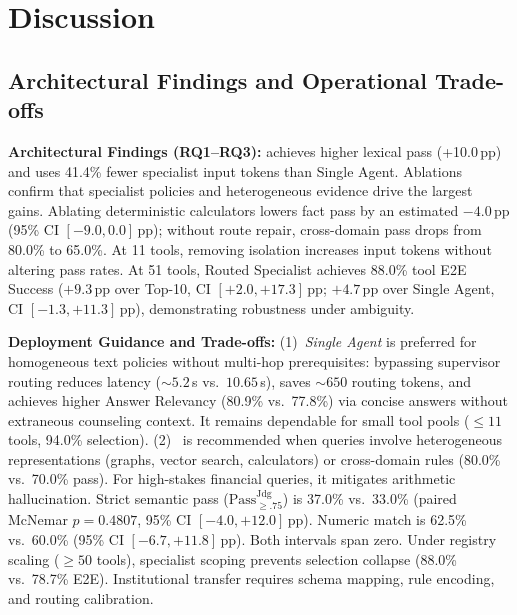 \section{Discussion}
\label{sec:discussion}

\subsection{Architectural Findings and Operational Trade-offs}

\textbf{Architectural Findings (RQ1--RQ3):}
\system{} achieves higher lexical pass (+10.0\,pp) and uses 41.4\% fewer specialist input tokens than Single Agent. Ablations confirm that specialist policies and heterogeneous evidence drive the largest gains. Ablating deterministic calculators lowers fact pass by an estimated $-4.0$\,pp (95\% CI $[-9.0, 0.0]$\,pp); without route repair, cross-domain pass drops from 80.0\% to 65.0\%. At 11 tools, removing isolation increases input tokens without altering pass rates. At 51 tools, Routed Specialist achieves 88.0\% tool E2E Success ($+9.3$\,pp over Top-10, CI $[+2.0, +17.3]$\,pp; $+4.7$\,pp over Single Agent, CI $[-1.3, +11.3]$\,pp), demonstrating robustness under ambiguity.

\textbf{Deployment Guidance and Trade-offs:}
(1)~\emph{Single Agent} is preferred for homogeneous text policies without multi-hop prerequisites: bypassing supervisor routing reduces latency (${\sim}5.2$\,s vs.\ $10.65$\,s), saves ${\sim}650$ routing tokens, and achieves higher Answer Relevancy (80.9\% vs.\ 77.8\%) via concise answers without extraneous counseling context. It remains dependable for small tool pools ($\le 11$ tools, 94.0\% selection).
(2)~\emph{\system{}} is recommended when queries involve heterogeneous representations (graphs, vector search, calculators) or cross-domain rules (80.0\% vs.\ 70.0\% pass). For high-stakes financial queries, it mitigates arithmetic hallucination. Strict semantic pass ($\text{Pass}_{\ge .75}^{\text{Jdg}}$) is 37.0\% vs.\ 33.0\% (paired McNemar $p{=}0.4807$, 95\% CI $[-4.0, +12.0]$\,pp). Numeric match is 62.5\% vs.\ 60.0\% (95\% CI $[-6.7, +11.8]$\,pp). Both intervals span zero. Under registry scaling ($\ge 50$ tools), specialist scoping prevents selection collapse (88.0\% vs.\ 78.7\% E2E). Institutional transfer requires schema mapping, rule encoding, and routing calibration.

